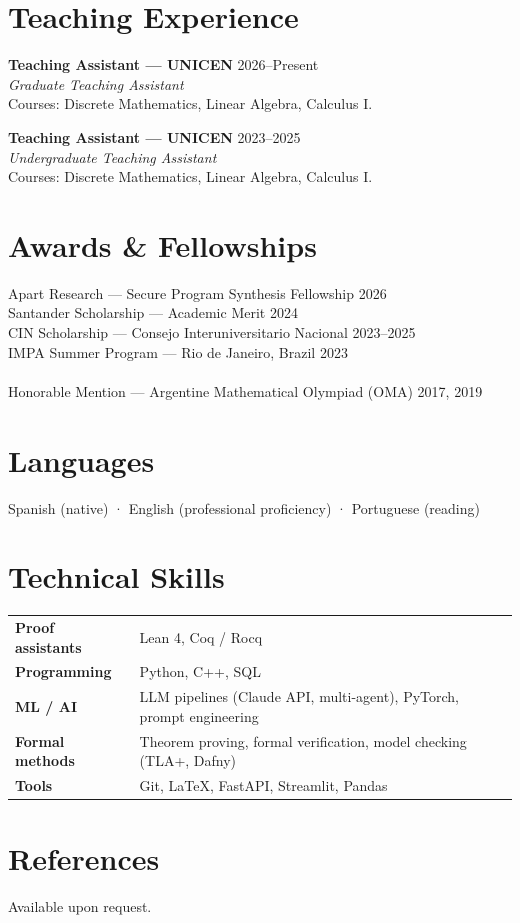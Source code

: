 \documentclass[11pt,a4paper]{article}
\begin{document}
\section{Teaching Experience}

\textbf{Teaching Assistant --- UNICEN} \hfill 2026--Present\\
\textit{Graduate Teaching Assistant}\\
Courses: Discrete Mathematics, Linear Algebra, Calculus I.

\vspace{0.3em}
\textbf{Teaching Assistant --- UNICEN} \hfill 2023--2025\\
\textit{Undergraduate Teaching Assistant}\\
Courses: Discrete Mathematics, Linear Algebra, Calculus I.

\section{Awards \& Fellowships}

Apart Research --- Secure Program Synthesis Fellowship \hfill 2026\\
Santander Scholarship --- Academic Merit \hfill 2024\\
CIN Scholarship --- Consejo Interuniversitario Nacional \hfill 2023--2025\\
IMPA Summer Program --- Rio de Janeiro, Brazil \hfill 2023\\
\\
Honorable Mention --- Argentine Mathematical Olympiad (OMA) \hfill 2017, 2019

\section{Languages}

Spanish (native) · English (professional proficiency) · Portuguese (reading)

\section{Technical Skills}

\begin{tabular}{@{}p{}p{}@{}}
  \textbf{Proof assistants} & Lean 4, Coq / Rocq \\
  \textbf{Programming}    & Python, C++, SQL \\
  \textbf{ML / AI}        & LLM pipelines (Claude API, multi-agent), PyTorch, prompt engineering \\
  \textbf{Formal methods} & Theorem proving, formal verification, model checking (TLA+, Dafny) \\
  \textbf{Tools}          & Git, LaTeX, FastAPI, Streamlit, Pandas \\
\end{tabular}

\section{References}

Available upon request.
\end{document}
